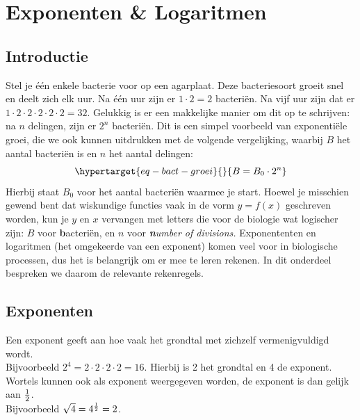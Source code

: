 \documentclass[
  a4paper,
]{scrbook}
\theoremstyle{definition}
\theoremstyle{remark}
\begin{document}
\hypertarget{sec-exponenten}{%
\chapter{Exponenten \& Logaritmen}\label{sec-exponenten}}

\hypertarget{introductie-2}{%
\section{Introductie}\label{introductie-2}}

Stel je één enkele bacterie voor op een agarplaat. Deze bacteriesoort
groeit snel en deelt zich elk uur. Na één uur zijn er \(1 \cdot 2 = 2\)
bacteriën. Na vijf uur zijn dat er
\(1 \cdot 2 \cdot 2 \cdot 2 \cdot 2 \cdot 2 = 32\). Gelukkig is er een
makkelijke manier om dit op te schrijven: na \(n\) delingen, zijn er
\(2^n\) bacteriën. Dit is een simpel voorbeeld van exponentiële groei,
die we ook kunnen uitdrukken met de volgende vergelijking, waarbij \(B\)
het aantal bacteriën is en \(n\) het aantal delingen:
\begin{equation}\protect\hypertarget{eq-bact-groei}{}{
B = B_0\cdot2^n
}\label{eq-bact-groei}\end{equation} Hierbij staat \(B_0\) voor het
aantal bacteriën waarmee je start. Hoewel je misschien gewend bent dat
wiskundige functies vaak in de vorm \(y=f(x)\) geschreven worden, kun je
\(y\) en \(x\) vervangen met letters die voor de biologie wat logischer
zijn: \(B\) voor \textbf{b}acteriën, en \(n\) voor \emph{\textbf{n}umber
of divisions.} Exponententen en logaritmen (het omgekeerde van een
exponent) komen veel voor in biologische processen, dus het is
belangrijk om er mee te leren rekenen. In dit onderdeel bespreken we
daarom de relevante rekenregels.

\hypertarget{exponenten}{%
\section{Exponenten}\label{exponenten}}

Een exponent geeft aan hoe vaak het grondtal met zichzelf
vermenigvuldigd wordt.\\
Bijvoorbeeld \(2^4 = 2 \cdot 2 \cdot 2 \cdot 2 = 16\). Hierbij is 2 het
grondtal en 4 de exponent.\\
Wortels kunnen ook als exponent weergegeven worden, de exponent is dan
gelijk aan \(1\over2\).\\
Bijvoorbeeld \(\sqrt{4} = 4^{1\over2} = 2\).
\end{document}

